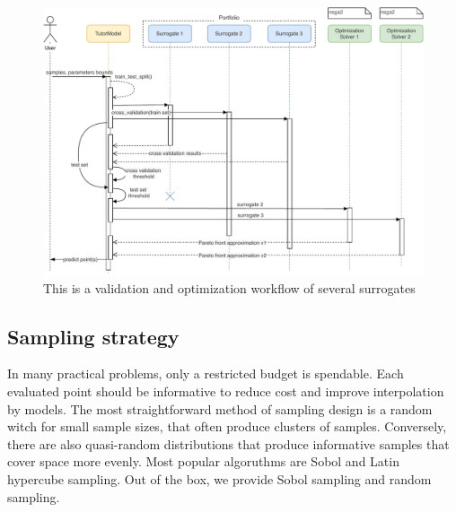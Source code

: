 
        \begin{figure}
            \centering
            \includegraphics[width=\textwidth]{content/images/portfolio_validation_solv}
            \caption[Portfolio validation activity]{This is a validation and optimization workflow of several surrogates}
            \label{fig:tutor_activity}
        \end{figure}



    \subsection{Sampling strategy} In many practical problems, only a restricted budget is spendable. Each evaluated point should be informative to reduce cost and improve interpolation by models. The most straightforward method of sampling design is a random witch for small sample sizes, that often produce clusters of samples. Conversely, there are also quasi-random distributions that produce informative samples that cover space more evenly. Most popular algoruthms are Sobol\cite{Sobol1999} and Latin hypercube sampling. 
    Out of the box, we provide Sobol sampling and random sampling.
    
    

